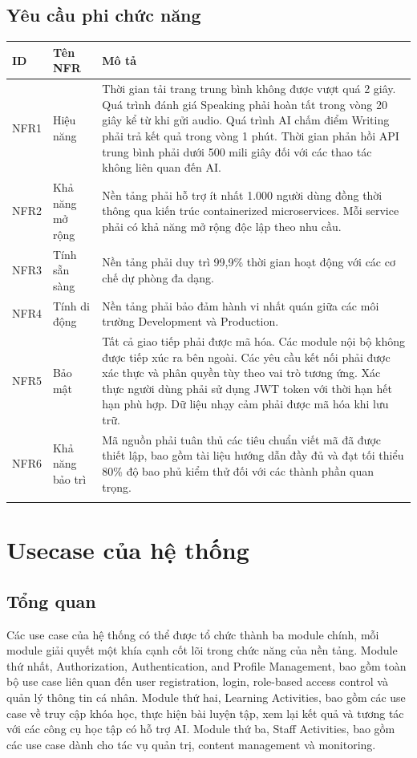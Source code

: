 \subsection{Yêu cầu phi chức năng}

{
\renewcommand{\arraystretch}{1.5} %
\begin{tabularx}{\textwidth}{|l|l|X|}
\hline
\textbf{ID} & \textbf{Tên NFR} & \textbf{Mô tả} \\ \hline
NFR1 & Hiệu năng & Thời gian tải trang trung bình không được vượt quá 2 giây. Quá trình đánh giá Speaking phải hoàn tất trong vòng 20 giây kể từ khi gửi audio. Quá trình AI chấm điểm Writing phải trả kết quả trong vòng 1 phút. Thời gian phản hồi API trung bình phải dưới 500 mili giây đối với các thao tác không liên quan đến AI. \\ \hline
NFR2 & Khả năng mở rộng & Nền tảng phải hỗ trợ ít nhất 1.000 người dùng đồng thời thông qua kiến trúc containerized microservices. Mỗi service phải có khả năng mở rộng độc lập theo nhu cầu. \\ \hline
NFR3 & Tính sẵn sàng & Nền tảng phải duy trì 99,9\% thời gian hoạt động với các cơ chế dự phòng đa dạng. \\ \hline
NFR4 & Tính di động & Nền tảng phải bảo đảm hành vi nhất quán giữa các môi trường Development và Production. \\ \hline
NFR5 & Bảo mật & Tất cả giao tiếp phải được mã hóa. Các module nội bộ không được tiếp xúc ra bên ngoài. Các yêu cầu kết nối phải được xác thực và phân quyền tùy theo vai trò tương ứng. Xác thực người dùng phải sử dụng JWT token với thời hạn hết hạn phù hợp. Dữ liệu nhạy cảm phải được mã hóa khi lưu trữ. \\ \hline
NFR6 & Khả năng bảo trì & Mã nguồn phải tuân thủ các tiêu chuẩn viết mã đã được thiết lập, bao gồm tài liệu hướng dẫn đầy đủ và đạt tối thiểu 80\% độ bao phủ kiểm thử đối với các thành phần quan trọng. \\ \hline
\caption{Bảng yêu cầu phi chức năng}
\end{tabularx}
}
\section{Usecase của hệ thống}
\subsection{Tổng quan}
Các use case của hệ thống có thể được tổ chức thành ba module chính, mỗi module giải quyết một khía cạnh cốt lõi trong chức năng của nền tảng. Module thứ nhất, Authorization, Authentication, and Profile Management, bao gồm toàn bộ use case liên quan đến user registration, login, role-based access control và quản lý thông tin cá nhân. Module thứ hai, Learning Activities, bao gồm các use case về truy cập khóa học, thực hiện bài luyện tập, xem lại kết quả và tương tác với các công cụ học tập có hỗ trợ AI. Module thứ ba, Staff Activities, bao gồm các use case dành cho tác vụ quản trị, content management và monitoring.

